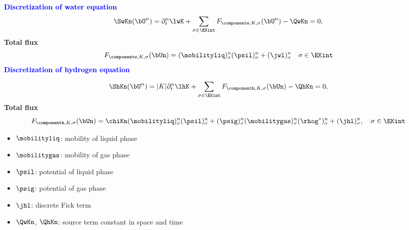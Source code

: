 \documentclass[10 pt]{beamer}
\begin{document}
\begin{frame}
\textcolor{blue}{\textbf{Discretization of water equation}}
\begin{equation*}
\SwKn(\bU^n) = \partial_t^n \lwK  + \sum_{\sigma \in \EKint} F_{\componentw,K,\sigma}(\bU^{n})-\QwKn = 0,
\end{equation*}
\textcolor{cadmiumgreen}{\textbf{Total flux}}
\begin{equation*}
F_{\componentw,K,\sigma}(\bUn) = (\mobilityliq)_{\sigma}^{n} (\psil)_{\sigma}^{n} + (\jwl)_{\sigma}^{n} \quad \sigma \in \EKint
\label{eq:total:flux:across:sigma:water component}
\end{equation*}
\pause
\textcolor{blue}{\textbf{Discretization of hydrogen equation}}

\begin{equation*} 
\ShKn(\bU^n)= |K| \partial_t^n \lhK + \sum_{\sigma \in \EKint} F_{\componenth,K,\sigma}(\bUn) - \QhKn = 0,
\label{eq:mass:conservation:equation:hydrogen:green:formula}
\end{equation*}
\textcolor{cadmiumgreen}{\textbf{Total flux}}
\begin{equation*}
\label{eq:total:flux:across:sigma:hydrogen:component}
 F_{\componenth,K,\sigma}(\bUn) = \chiKn (\mobilityliq)_{\sigma}^{n} (\psil)_{\sigma}^{n} + (\psig)_{\sigma}^{n} (\mobilitygas)_{\sigma}^{n} (\rhog^{*})_{\sigma}^{n} + (\jhl)_{\sigma}^{n} , \quad \sigma \in \EKint
\end{equation*}
\pause
\begin{minipage}{.47 \linewidth}
\begin{itemize}
\item 
$\mobilityliq$: mobility of liquid phase\\
\item 
$\mobilitygas$: mobility of gas phase
\item
$\psil$: potential of liquid phase\\
\item
$\psig$: potential of gas phase
\end{itemize}
\end{minipage}
\hfill
\begin{minipage}{.45 \linewidth}
\begin{itemize}
\item
$\jhl$: discrete Fick term\\
\item
  $\QwKn$, $\QhKn$: source term constant in space and time
\end{itemize}
\end{minipage}
\end{frame}
\end{document}
